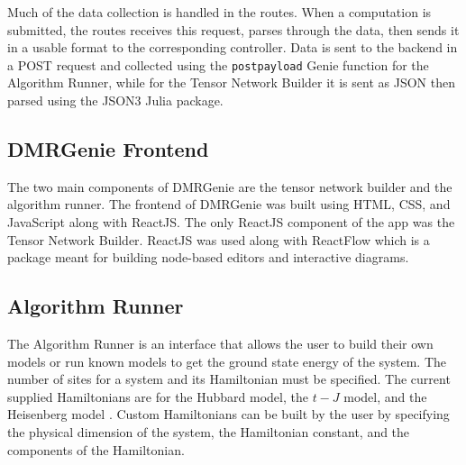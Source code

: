 \documentclass{juliacon}
\begin{document}
Much of the data collection is handled in the routes. When a computation is submitted, the routes receives this request, parses through the data, then sends it in a usable format to the corresponding controller. Data is sent to the backend in a POST request and collected using the \texttt{postpayload} Genie function for the Algorithm Runner, while for the Tensor Network Builder it is sent as JSON then parsed using the JSON3 Julia package.

\subsection{DMRGenie Frontend}
The two main components of DMRGenie are the tensor network builder and the algorithm runner. The frontend of DMRGenie was built using HTML, CSS, and JavaScript along with ReactJS. The only ReactJS component of the app was the Tensor Network Builder. ReactJS was used along with ReactFlow which is a package meant for building node-based editors and interactive diagrams. 

\subsection{Algorithm Runner}
The Algorithm Runner is an interface that allows the user to build their own models or run known models to get the ground state energy of the system. The number of sites for a system and its Hamiltonian must be specified. The current supplied Hamiltonians are for the Hubbard model, the $t-J$ model, and the Heisenberg model \cite{fradkin2013field}. Custom Hamiltonians can be built by the user by specifying the physical dimension of the system, the Hamiltonian constant, and the components of the Hamiltonian.
\end{document}
